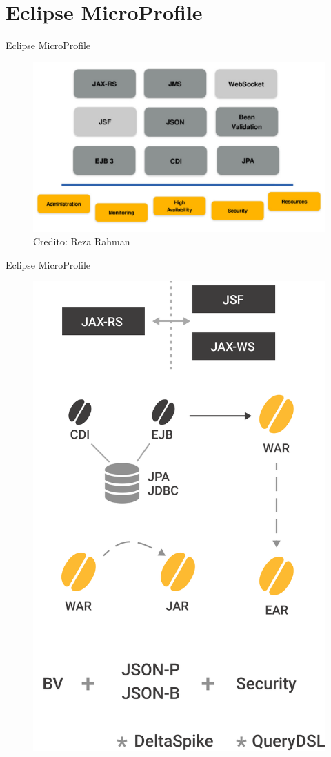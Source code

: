 \documentclass[aspectratio=169]{beamer}
\begin{document}
{
    \section{Eclipse MicroProfile}
}


\begin{frame}{Eclipse MicroProfile}
\begin{figure}
	\centering
	\includegraphics[width=0.8\linewidth]{Images/javaeemicropancake}
	\caption{Credito: Reza Rahman}
\end{figure}
\end{frame}

\begin{frame}{Eclipse MicroProfile}
	\begin{figure}
		\centering
		\includegraphics[width=0.4\linewidth]{Images/oldsetup}
	\end{figure}
\end{frame}
\end{document}
